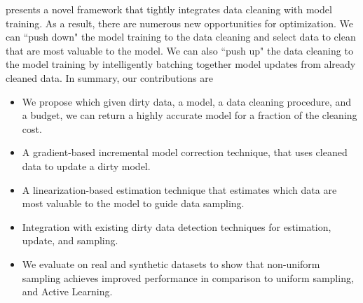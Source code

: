 \sys presents a novel framework that tightly integrates data cleaning with model training.
As a result, there are numerous new opportunities for optimization.
We can ``push down" the model training to the data cleaning and select data to clean that are most valuable to the model.
We can also ``push up" the data cleaning to the model training by intelligently batching together model updates from already cleaned data.
In summary, our contributions are
\begin{itemize}[noitemsep]
\item We propose \sysfull which given dirty data, a model, a data cleaning procedure, and a budget, we can return a highly accurate model for a fraction of the cleaning cost.
\item A gradient-based incremental model correction technique, that uses cleaned data to update a dirty model.
\item A linearization-based estimation technique that estimates which data are most valuable to the model to guide data sampling.
\item Integration with existing dirty data detection techniques for estimation, update, and sampling.
\item We evaluate \sysfull on real and synthetic datasets to show that non-uniform sampling achieves improved performance in comparison to uniform sampling, and Active Learning.
\end{itemize}






